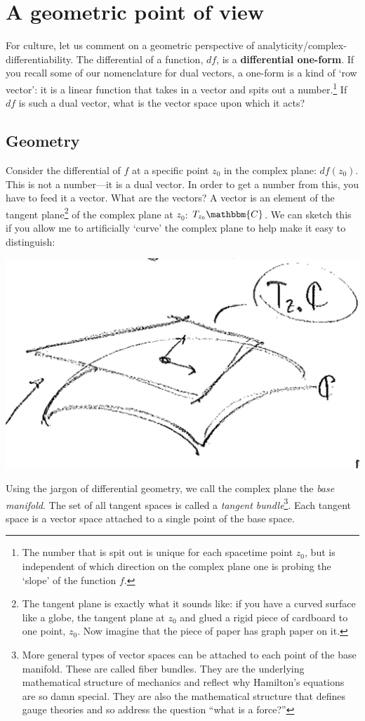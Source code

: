 \section{A geometric point of view}
\label{sec:analytic:geometric}

For culture, let us comment on a geometric perspective of analyticity/complex-differentiability. The differential of a function, $df$, is a \textbf{differential one-form}. If you recall some of our nomenclature for dual vectors, a one-form is a kind of `row vector': it is a linear function that takes in a vector and spits out a number.\footnote{The number that is spit out is unique for each spacetime point $z_0$, but is independent of which direction on the complex plane one is probing the `slope' of the function $f$.} If $df$ is such a dual vector, what is the vector space upon which it acts?

\subsection{Geometry}

Consider the differential of $f$ at a specific point $z_0$ in the complex plane: $df(z_0)$. This is not a number---it is a dual vector. In order to get a number from this, you have to feed it a vector. What are the vectors? A vector is an element of the tangent plane\footnote{The tangent plane is exactly what it sounds like: if you have a curved surface like a globe, the tangent plane at $z_0$ and glued a rigid piece of cardboard to one point, $z_0$. Now imagine that the piece of paper has graph paper on it.} of the complex plane at $z_0$: $T_{z_0}\mathbbm{C}$. We can sketch this if you allow me to artificially `curve' the complex plane to help make it easy to distinguish:
\begin{center}
\includegraphics[width=.5\textwidth]{figures/lec13_mani.png}
\end{center}
Using the jargon of differential geometry, we call the complex plane the \emph{base manifold}. The set of all tangent spaces is called a \emph{tangent bundle}\footnote{More general types of vector spaces can be attached to each point of the base manifold. These are called fiber bundles. They are the underlying mathematical structure of mechanics and reflect why Hamilton's equations are so damn special. They are also the mathematical structure that defines gauge theories and so address the question ``what is a force?''}. Each tangent space is a vector space attached to a single point of the base space. 

